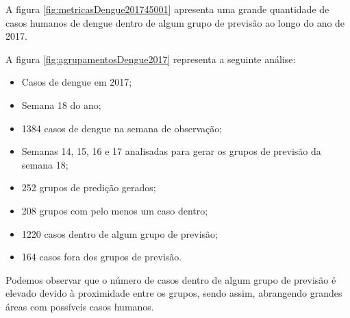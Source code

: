 A figura \ref{fig:metricasDengue201745001} apresenta uma grande quantidade de casos humanos de dengue dentro de algum grupo de previsão ao longo do ano de 2017.
\begin{figure}[!ht]
	\centering	
\end{figure}
\FloatBarrier

A figura \ref{fig:agrupamentosDengue2017} representa a seguinte análise:
\begin{itemize}
    \item Casos de dengue em 2017;
    \item Semana 18 do ano;
    \item 1384 casos de dengue na semana de observação;
    \item Semanas  14, 15, 16 e 17 analisadas para gerar os grupos de previsão da semana 18;
    \item 252 grupos de predição gerados;
    \item 208 grupos com pelo menos um caso dentro;
    \item 1220 casos dentro de algum grupo de previsão;
    \item 164 casos fora dos grupos de previsão.
\end{itemize}

Podemos observar que o número de casos dentro de algum grupo de previsão é elevado devido à proximidade entre os grupos, sendo assim, abrangendo grandes áreas com possíveis casos humanos.

